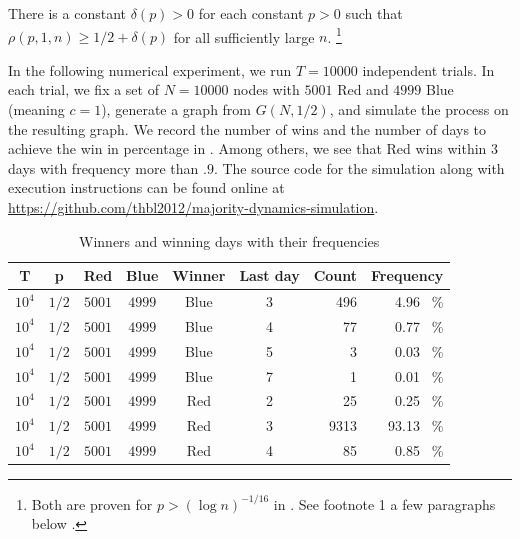 \documentclass{toc}
\begin{document}
			\begin{conjecture} \label{conj:advantage-1}
				There is a constant $\delta(p) > 0$ for each constant $p > 0$ such that  $\rho (p, 1, n) \ge 1/2 + \delta(p)$ for all sufficiently large $n$.
				\footnote[1]{Both   are proven for $p > (\log n)^{-1/16}$ in \cite{sahsawhney2021}. See footnote 1 a few paragraphs below .}
			\end{conjecture}
			
			In the following numerical experiment,  we run $T = 10000$ independent trials.  In each trial, we  fix a set of $N = 10000$ nodes with $5001$ Red and $4999$  Blue (meaning $c=1$), generate a graph from $G(N, 1/2)$,  and simulate the process on the resulting graph. We record the number of wins  and the number of days to achieve the win in percentage  in . Among others, we see that Red wins within $3$ days with frequency more than $.9$.
			The source code for the simulation along with execution
			instructions can be found online at \url{https://github.com/thbl2012/majority-dynamics-simulation}.
			\begin{table}[h]
				\centering
				
				\begin{tabular}{|ccccccrr|}\hline
					T & p & Red & Blue & 	Winner & Last day & Count & Frequency \\
					\hline
					$10^4$ & $1/2$ & $5001$ & $4999$ &	Blue & 3 & 496 & 4.96 \ \% \\
					$10^4$ & $1/2$ & $5001$ & $4999$ &	Blue & 4 & 77 & 0.77 \ \% \\
					$10^4$ & $1/2$ & $5001$ & $4999$ &	Blue & 5 & 3 & 0.03 \ \% \\
					$10^4$ & $1/2$ & $5001$ & $4999$ &	Blue & 7 & 1 & 0.01 \ \% \\
					$10^4$ & $1/2$ & $5001$ & $4999$ &	Red & 2 & 25 & 0.25 \ \% \\
					$10^4$ & $1/2$ & $5001$ & $4999$ &	Red & 3 & 9313 & 93.13 \ \% \\
					$10^4$ & $1/2$ & $5001$ & $4999$ &	Red & 4 & 85 & 0.85 \ \% \\
					\hline
				\end{tabular}
				\vspace{3pt}
				
				\caption{Winners and winning days with their frequencies}
				\label{tab:voting-sim}
			\end{table}
			
\end{document}
